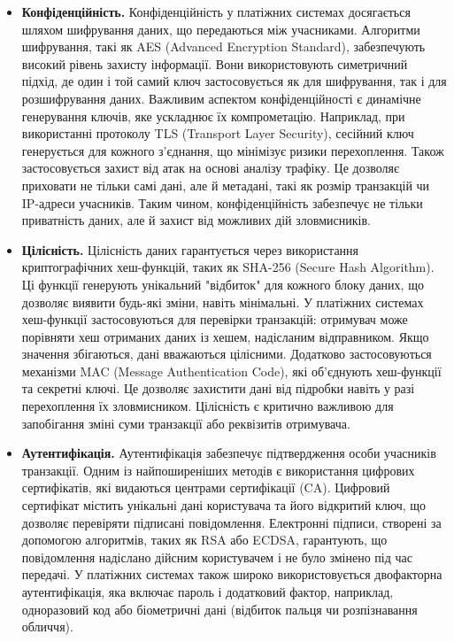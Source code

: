 \begin{itemize}
    \item \textbf{Конфіденційність.} Конфіденційність у платіжних системах досягається шляхом шифрування даних, що передаються між учасниками. Алгоритми шифрування, такі як AES (Advanced Encryption Standard), забезпечують високий рівень захисту інформації. Вони використовують симетричний підхід, де один і той самий ключ застосовується як для шифрування, так і для розшифрування даних. Важливим аспектом конфіденційності є динамічне генерування ключів, яке ускладнює їх компрометацію. Наприклад, при використанні протоколу TLS (Transport Layer Security), сесійний ключ генерується для кожного з'єднання, що мінімізує ризики перехоплення. Також застосовується захист від атак на основі аналізу трафіку. Це дозволяє приховати не тільки самі дані, але й метадані, такі як розмір транзакцій чи IP-адреси учасників. Таким чином, конфіденційність забезпечує не тільки приватність даних, але й захист від можливих дій зловмисників.
    \item \textbf{Цілісність.} Цілісність даних гарантується через використання криптографічних хеш-функцій, таких як SHA-256 (Secure Hash Algorithm). Ці функції генерують унікальний "відбиток" для кожного блоку даних, що дозволяє виявити будь-які зміни, навіть мінімальні. У платіжних системах хеш-функції застосовуються для перевірки транзакцій: отримувач може порівняти хеш отриманих даних із хешем, надісланим відправником. Якщо значення збігаються, дані вважаються цілісними. Додатково застосовуються механізми MAC (Message Authentication Code), які об'єднують хеш-функції та секретні ключі. Це дозволяє захистити дані від підробки навіть у разі перехоплення їх зловмисником. Цілісність є критично важливою для запобігання зміні суми транзакції або реквізитів отримувача.
    \item \textbf{Аутентифікація.} Аутентифікація забезпечує підтвердження особи учасників транзакції. Одним із найпоширеніших методів є використання цифрових сертифікатів, які видаються центрами сертифікації (CA). Цифровий сертифікат містить унікальні дані користувача та його відкритий ключ, що дозволяє перевіряти підписані повідомлення. Електронні підписи, створені за допомогою алгоритмів, таких як RSA або ECDSA, гарантують, що повідомлення надіслано дійсним користувачем і не було змінено під час передачі. У платіжних системах також широко використовується двофакторна аутентифікація, яка включає пароль і додатковий фактор, наприклад, одноразовий код або біометричні дані (відбиток пальця чи розпізнавання обличчя).

\end{itemize}

